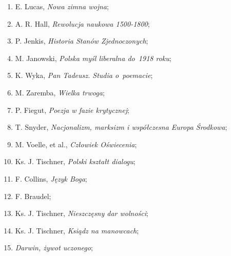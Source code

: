 \documentclass[a4paper,11pt]{article}
\begin{document}
\begin{enumerate}
\item E. Lucas, \textit{Nowa zimna wojna};



\item A. R. Hall, \textit{Rewolucja naukowa 1500-1800};



\item P. Jenkis, \textit{Historia Stanów Zjednoczonych};



\item M. Janowski, \textit{Polska myśl liberalna do~1918 roku};



\item K. Wyka, \textit{Pan Tadeusz. Studia o~poemacie};



\item M. Zaremba, \textit{Wielka trwoga};



\item P. Fiegut, \textit{Poezja w fazie krytycznej};



\item T. Snyder, \textit{Nacjonalizm, marksizm i współczesna Europa
    Środkowa};



\item M. Voelle, et al., \textit{Człowiek Oświecenia};



\item Ks. J. Tischner, \textit{Polski kształt dialogu};



\item F. Collins, \textit{Język Boga};



\item F. Braudel;



\item Ks. J. Tischner, \textit{Nieszczęsny dar wolności};



\item Ks. J. Tischner, \textit{Ksiądz na manowcach};



\item \textit{Darwin, żywot uczonego};




\end{enumerate}
\end{document}
